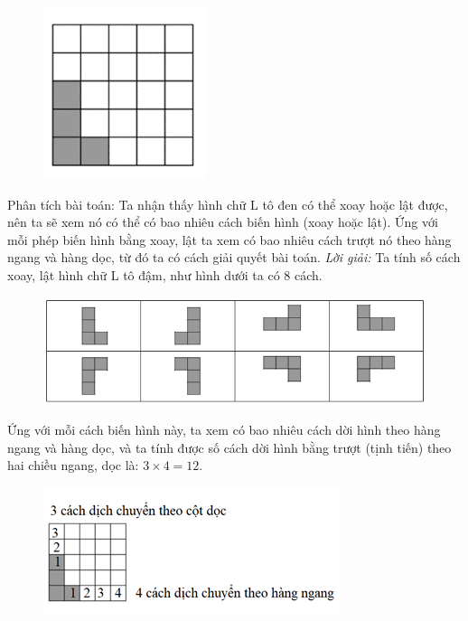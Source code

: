 \begin{multicols}{2}
		\begin{figure}[H]
			\centering
			\vspace*{-10pt}
			\captionsetup{labelformat=empty, justification=centering}
			\includegraphics[width=0.4\linewidth]{_13}
			\vspace*{-15pt}
		\end{figure}
	Phân tích bài toán: Ta nhận thấy hình chữ L tô đen có thể xoay hoặc lật được, nên ta sẽ xem nó có thể có bao nhiêu cách biến hình (xoay hoặc lật).  Ứng với mỗi phép biến hình bằng xoay, lật ta xem có bao nhiêu cách trượt nó theo hàng ngang và hàng dọc, từ đó ta có cách giải quyết bài toán.
	\vskip 0.1cm
	\textit{Lời giải:}
	\vskip 0.1cm
	Ta tính số cách xoay, lật hình chữ L tô đậm, như hình dưới ta có $8$ cách.
	\begin{figure}[H]
		\centering
		\vspace*{-10pt}
		\captionsetup{labelformat=empty, justification=centering}
		\includegraphics[width=1\linewidth]{_14}
		\vspace*{-15pt}
	\end{figure}
	Ứng với mỗi cách biến hình này, ta xem có bao nhiêu cách dời hình theo hàng ngang và hàng dọc, và ta tính được số cách dời hình bằng trượt (tịnh tiến) theo hai chiều ngang, dọc là: $3\times4=12$.
	\vskip 0.1cm
		\begin{figure}[H]
			\centering
			\vspace*{-10pt}
			\captionsetup{labelformat=empty, justification=centering}
			\includegraphics[width=1\linewidth]{_15}

\end{figure}
\end{multicols}
